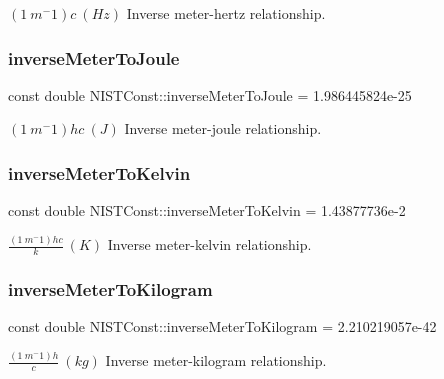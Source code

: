 $(1\ m^-1)c \ (Hz)$ Inverse meter-\/hertz relationship. \mbox{\label{group___inverse_meter_gaa927232a822dccc33f7c56ac002aff52}} 
\subsubsection{\texorpdfstring{inverse\+Meter\+To\+Joule}{inverseMeterToJoule}}
{\footnotesize\ttfamily const double N\+I\+S\+T\+Const\+::inverse\+Meter\+To\+Joule = 1.\+986445824e-\/25}

$(1\ m^-1)hc \ (J)$ Inverse meter-\/joule relationship. \mbox{\label{group___inverse_meter_gaf5a61f53f6757db329df597b76b2df69}} 
\subsubsection{\texorpdfstring{inverse\+Meter\+To\+Kelvin}{inverseMeterToKelvin}}
{\footnotesize\ttfamily const double N\+I\+S\+T\+Const\+::inverse\+Meter\+To\+Kelvin = 1.\+43877736e-\/2}

$\frac{(1\ m^-1)hc}{k} \ (K)$ Inverse meter-\/kelvin relationship. \mbox{\label{group___inverse_meter_ga6b5807b2161fa29684e4862e575b9102}} 
\subsubsection{\texorpdfstring{inverse\+Meter\+To\+Kilogram}{inverseMeterToKilogram}}
{\footnotesize\ttfamily const double N\+I\+S\+T\+Const\+::inverse\+Meter\+To\+Kilogram = 2.\+210219057e-\/42}

$\frac{(1\ m^-1)h}{c} \ (kg)$ Inverse meter-\/kilogram relationship. 